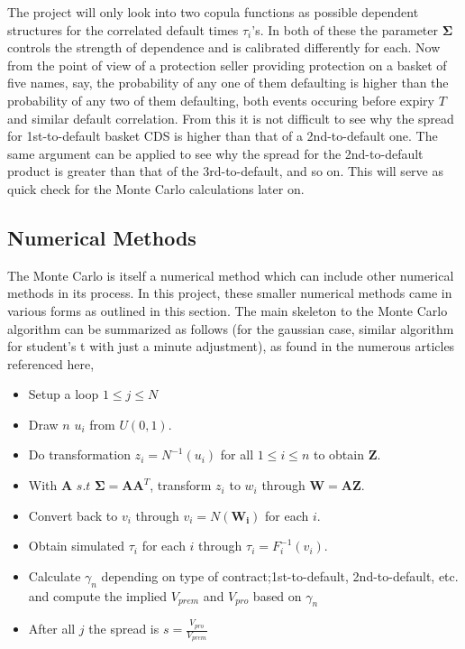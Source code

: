 \documentclass[a4paper,12pt]{article}
\begin{document}
The project will only look into two copula functions as possible dependent structures for the correlated default times $\tau_i$'s. In both of these the parameter $\mathbf{\Sigma}$ controls the strength of dependence and is calibrated differently for each. 
\newline
Now from the point of view of a protection seller providing protection on a basket of five names, say, the probability of any one of them defaulting is higher than the probability of any two of them defaulting, both events occuring before expiry $T$ and similar default correlation. From this it is not difficult to see why the spread for 1st-to-default basket CDS is higher than that of a 2nd-to-default one. The same argument can be applied to see why the spread for the 2nd-to-default product is greater  than that of the 3rd-to-default, and so on. This will serve as quick check for the Monte Carlo calculations later on.

\subsection{Numerical Methods}
The Monte Carlo is itself a numerical method which can include other numerical methods in its process. In this project, these smaller numerical methods came in various forms as outlined in this section. The main skeleton to the Monte Carlo algorithm can be summarized as follows (for the gaussian case, similar algorithm for student's t with just a minute adjustment), as found in the numerous articles referenced here, 

\begin{itemize}
\item Setup a loop $1 \leq j \leq N$
\item Draw $n$ $u_i$ from $U(0, 1)$.
\item Do transformation $z_i = N^{-1}(u_i)$ for all $1 \leq i \leq n$ to obtain $\mathbf{Z}$.
\item With $\mathbf{A}$ $s.t $ $\mathbf{\Sigma} = \mathbf{A}\mathbf{A}^T$, transform $z_i$ to $w_i$ through $\mathbf{W} = \mathbf{A}\mathbf{Z}$.
\item Convert back to $v_i$ through $v_i = N(\mathbf{W_i})$ for each $i$.
\item Obtain simulated $\tau_i$ for each $i$ through $\tau_i = F_i^{-1}(v_i)$. 
\item Calculate $\gamma_n$ depending on type of contract;1st-to-default, 2nd-to-default, etc. and compute the implied $V_{prem}$ and $V_{pro}$ based on $\gamma_n$
\item After all $j$ the spread is $s= \frac{V_{pro}}{V_{prem}}$
\end{itemize}
\end{document}
